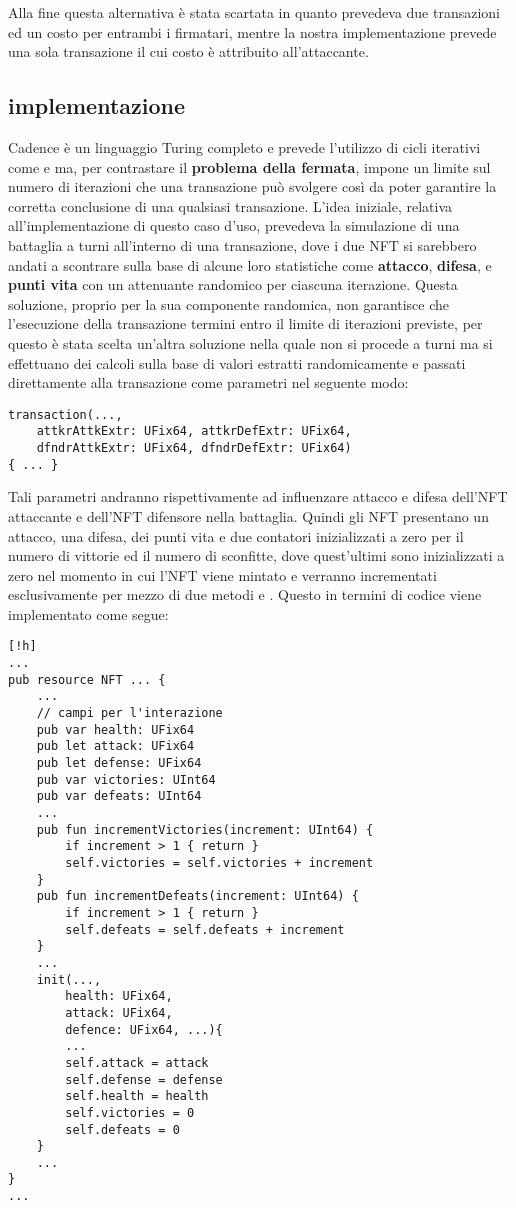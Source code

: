 Alla fine questa alternativa è stata scartata in quanto prevedeva due transazioni ed un costo per entrambi i firmatari, mentre la nostra implementazione prevede una sola transazione il cui costo è attribuito all'attaccante.

\subsection{implementazione}
Cadence è un linguaggio Turing completo e prevede l'utilizzo di cicli iterativi come  e  ma, per contrastare il \textbf{problema della fermata}, impone un limite sul numero di iterazioni che una transazione può svolgere così da poter garantire la corretta conclusione di una qualsiasi transazione. L'idea iniziale, relativa all'implementazione di questo caso d'uso, prevedeva la simulazione di una battaglia a turni all'interno di una transazione, dove i due NFT si sarebbero andati a scontrare sulla base di alcune loro statistiche come \textbf{attacco}, \textbf{difesa}, e \textbf{punti vita} con un attenuante randomico per ciascuna iterazione. Questa soluzione, proprio per la sua componente randomica, non garantisce che l'esecuzione della transazione termini entro il limite di iterazioni previste, per questo è stata scelta un'altra soluzione nella quale non si procede a turni ma si effettuano dei calcoli sulla base di valori estratti randomicamente e passati direttamente alla transazione come parametri nel seguente modo:
\begin{lstlisting}[style=all, style=cadence]
transaction(..., 
	attkrAttkExtr: UFix64, attkrDefExtr: UFix64, 
    dfndrAttkExtr: UFix64, dfndrDefExtr: UFix64)
{ ... }
\end{lstlisting}
Tali parametri andranno rispettivamente ad influenzare attacco e difesa dell'NFT attaccante e dell'NFT difensore nella battaglia. Quindi gli NFT presentano un attacco, una difesa, dei punti vita e due contatori inizializzati a zero per il numero di vittorie ed il numero di sconfitte, dove quest'ultimi sono inizializzati a zero nel momento in cui l'NFT viene mintato e verranno incrementati esclusivamente per mezzo di due metodi  e . Questo in termini di codice viene implementato come segue:
\begin{lstlisting}[style=all, style=cadence][!h]
...
pub resource NFT ... {
	...
    // campi per l'interazione
    pub var health: UFix64
    pub let attack: UFix64
    pub let defense: UFix64
    pub var victories: UInt64 
    pub var defeats: UInt64
    ...
    pub fun incrementVictories(increment: UInt64) {
        if increment > 1 { return }
        self.victories = self.victories + increment
    }
    pub fun incrementDefeats(increment: UInt64) {
        if increment > 1 { return }
        self.defeats = self.defeats + increment
    }
	...
	init(...,
		health: UFix64,
       	attack: UFix64,
        defence: UFix64, ...){
		...
		self.attack = attack
        self.defense = defense
        self.health = health
        self.victories = 0
        self.defeats = 0
	}
	...
}
...
\end{lstlisting}
